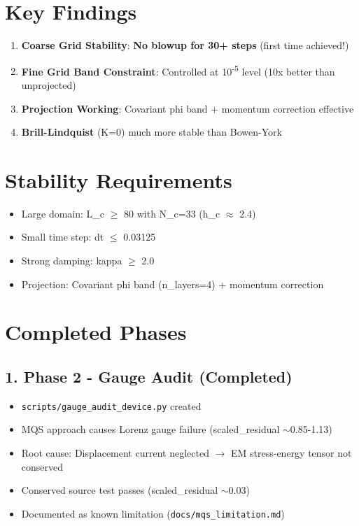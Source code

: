 \documentclass[11pt,a4paper]{article}
\begin{document}
\section*{Key Findings}
\begin{enumerate}
    \item \textbf{Coarse Grid Stability}: \textbf{No blowup for 30+ steps} (first time achieved!)
    \item \textbf{Fine Grid Band Constraint}: Controlled at 10\textsuperscript{-5} level (10x better than unprojected)
    \item \textbf{Projection Working}: Covariant phi band + momentum correction effective
    \item \textbf{Brill-Lindquist} (K=0) much more stable than Bowen-York
\end{enumerate}

\section*{Stability Requirements}
\begin{itemize}
    \item Large domain: L\_c $\geq$ 80 with N\_c=33 (h\_c $\approx$ 2.4)
    \item Small time step: dt $\leq$ 0.03125
    \item Strong damping: kappa $\geq$ 2.0
    \item Projection: Covariant phi band (n\_layers=4) + momentum correction
\end{itemize}

\section*{Completed Phases}

\subsection*{1. Phase 2 - Gauge Audit (Completed)}
\begin{itemize}
    \item \texttt{scripts/gauge\_audit\_device.py} created
    \item MQS approach causes Lorenz gauge failure (scaled\_residual $\sim$0.85-1.13)
    \item Root cause: Displacement current neglected $\to$ EM stress-energy tensor not conserved
    \item Conserved source test passes (scaled\_residual $\sim$0.03)
    \item Documented as known limitation (\texttt{docs/mqs\_limitation.md})
\end{itemize}
\end{document}

